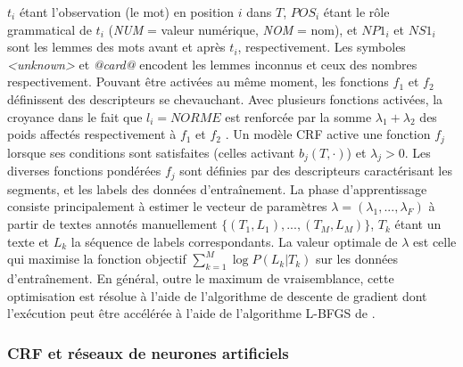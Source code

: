 $t_i$ étant l'observation (le mot) en position $i$ dans $T$, $POS_i$ étant le rôle grammatical de $t_i$ (\textit{NUM} = valeur numérique, \textit{NOM} = nom), et $NP1_i$ et $NS1_i$ sont les lemmes des mots avant et après $t_i$, respectivement. Les symboles \textit{<unknown>} et \textit{@card@} encodent les lemmes inconnus et ceux des nombres respectivement. Pouvant être activées au même moment, les fonctions $f_1$ et $f_2$ définissent des descripteurs se chevauchant. Avec plusieurs fonctions activées, la croyance dans le fait que $l_i = NORME$ est renforcée par la somme $\lambda_1 + \lambda_2$ des poids affectés respectivement à $f_1$ et $f_2$ \citep{Zhu2010CRFlecture}.  Un modèle CRF active une fonction $f_j$ lorsque ses conditions sont satisfaites (celles activant $b_j(T,\cdot)$) et $\lambda_j > 0$. Les diverses fonctions pondérées $f_j$ sont définies par des descripteurs caractérisant les segments, et les labels des données d'entraînement. La phase d'apprentissage consiste principalement à estimer le vecteur de paramètres $\lambda = (\lambda_1,...,\lambda_F)$ à partir de textes annotés manuellement $ \lbrace (T_1, L_1), ..., (T_M, L_M) \rbrace $, $ T_k $ étant un texte et $ L_k $ la séquence de labels correspondants. La valeur optimale de $\lambda$ est celle qui maximise la fonction objectif   
$\sum\limits_ {k = 1} ^ M \log P (L_k \vert T_k) $ sur les données d'entraînement. En général, outre le maximum de vraisemblance, cette optimisation est résolue à l'aide de l'algorithme de descente de gradient dont l'exécution peut être accélérée à l'aide de l'algorithme L-BFGS de \citet{liu1989l-bfgs}.

\subsubsection{CRF et réseaux de neurones artificiels}

